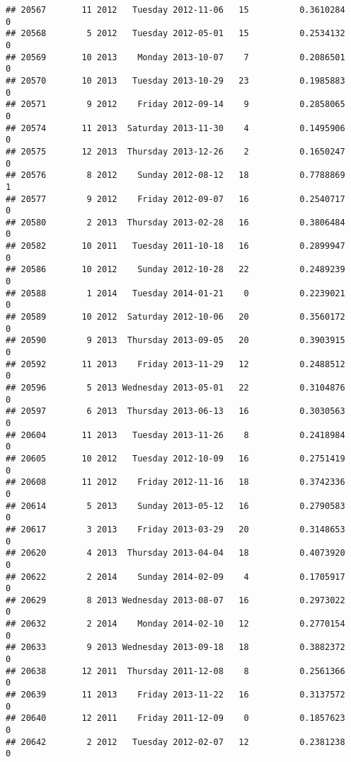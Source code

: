 \documentclass[
]{article}
\begin{document}
\begin{verbatim}
## 20567       11 2012   Tuesday 2012-11-06   15          0.3610284             0
## 20568        5 2012   Tuesday 2012-05-01   15          0.2534132             0
## 20569       10 2013    Monday 2013-10-07    7          0.2086501             0
## 20570       10 2013   Tuesday 2013-10-29   23          0.1985883             0
## 20571        9 2012    Friday 2012-09-14    9          0.2858065             0
## 20574       11 2013  Saturday 2013-11-30    4          0.1495906             0
## 20575       12 2013  Thursday 2013-12-26    2          0.1650247             0
## 20576        8 2012    Sunday 2012-08-12   18          0.7788869             1
## 20577        9 2012    Friday 2012-09-07   16          0.2540717             0
## 20580        2 2013  Thursday 2013-02-28   16          0.3806484             0
## 20582       10 2011   Tuesday 2011-10-18   16          0.2899947             0
## 20586       10 2012    Sunday 2012-10-28   22          0.2489239             0
## 20588        1 2014   Tuesday 2014-01-21    0          0.2239021             0
## 20589       10 2012  Saturday 2012-10-06   20          0.3560172             0
## 20590        9 2013  Thursday 2013-09-05   20          0.3903915             0
## 20592       11 2013    Friday 2013-11-29   12          0.2488512             0
## 20596        5 2013 Wednesday 2013-05-01   22          0.3104876             0
## 20597        6 2013  Thursday 2013-06-13   16          0.3030563             0
## 20604       11 2013   Tuesday 2013-11-26    8          0.2418984             0
## 20605       10 2012   Tuesday 2012-10-09   16          0.2751419             0
## 20608       11 2012    Friday 2012-11-16   18          0.3742336             0
## 20614        5 2013    Sunday 2013-05-12   16          0.2790583             0
## 20617        3 2013    Friday 2013-03-29   20          0.3148653             0
## 20620        4 2013  Thursday 2013-04-04   18          0.4073920             0
## 20622        2 2014    Sunday 2014-02-09    4          0.1705917             0
## 20629        8 2013 Wednesday 2013-08-07   16          0.2973022             0
## 20632        2 2014    Monday 2014-02-10   12          0.2770154             0
## 20633        9 2013 Wednesday 2013-09-18   18          0.3882372             0
## 20638       12 2011  Thursday 2011-12-08    8          0.2561366             0
## 20639       11 2013    Friday 2013-11-22   16          0.3137572             0
## 20640       12 2011    Friday 2011-12-09    0          0.1857623             0
## 20642        2 2012   Tuesday 2012-02-07   12          0.2381238             0

\end{verbatim}
\end{document}

